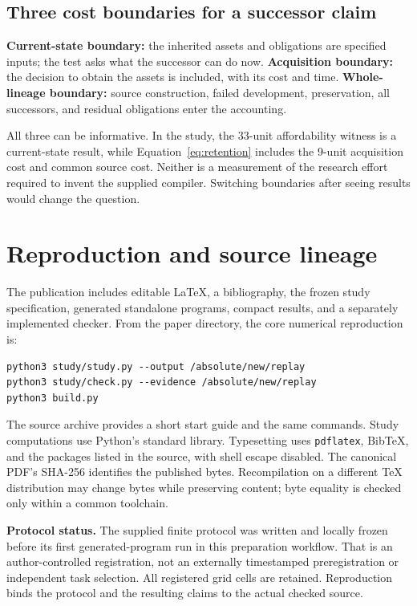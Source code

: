 \subsection{Three cost boundaries for a successor claim}

\textbf{Current-state boundary:} the inherited assets and obligations are specified inputs; the test asks what the successor can do now. \textbf{Acquisition boundary:} the decision to obtain the assets is included, with its cost and time. \textbf{Whole-lineage boundary:} source construction, failed development, preservation, all successors, and residual obligations enter the accounting.

All three can be informative. In the study, the 33-unit affordability witness is a current-state result, while Equation~\ref{eq:retention} includes the 9-unit acquisition cost and common source cost. Neither is a measurement of the research effort required to invent the supplied compiler. Switching boundaries after seeing results would change the question.

\section{Reproduction and source lineage}
\label{app:reproduction}

The publication includes editable \LaTeX, a bibliography, the frozen study specification, generated standalone programs, compact results, and a separately implemented checker. From the paper directory, the core numerical reproduction is:
\begin{lstlisting}
python3 study/study.py --output /absolute/new/replay
python3 study/check.py --evidence /absolute/new/replay
python3 build.py
\end{lstlisting}

The source archive provides a short start guide and the same commands. Study computations use Python's standard library. Typesetting uses \texttt{pdflatex}, BibTeX, and the packages listed in the source, with shell escape disabled. The canonical PDF's SHA-256 identifies the published bytes. Recompilation on a different TeX distribution may change bytes while preserving content; byte equality is checked only within a common toolchain.

\textbf{Protocol status.} The supplied finite protocol was written and locally frozen before its first generated-program run in this preparation workflow. That is an author-controlled registration, not an externally timestamped preregistration or independent task selection. All registered grid cells are retained. Reproduction binds the protocol and the resulting claims to the actual checked source.

